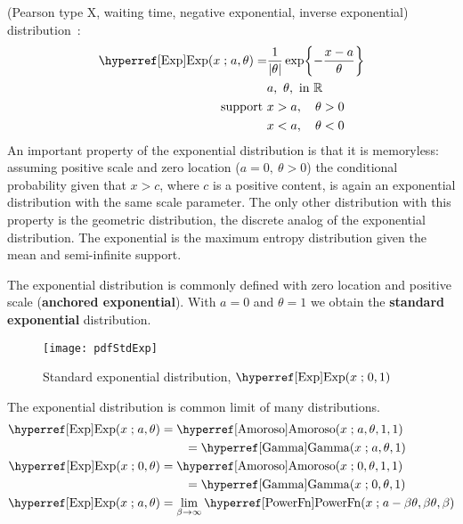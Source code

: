 

\label{sec:Exp}
 (Pearson type X, waiting time, negative exponential, inverse exponential) distribution~\cite{Pearson1916,Kondo1930,Johnson1994}:
%
\begin{align}
\label{Exp}
\opr{Exp}(x \given a, \theta) 
= & \frac{1}{|\theta|} \exp\Left\{-\frac{x-a}{\theta}\Right\} 	\checked
\\ \notag 
& a,\ \theta, \text{ in } \mathbb{R}  					\checked
\\ \notag
\text{support } & x > a, \quad \theta>0 				\checked
\\ \notag
& x < a, \quad \theta<0 							\checked
\end{align}
An important property of the exponential distribution is that it is memoryless: assuming positive scale and zero location ($a=0,\ \theta>0$) the conditional probability given that $x>c$, where $c$ is a positive content, is again an exponential distribution with the same scale parameter. The only other distribution with this property is the geometric distribution, the discrete analog of the exponential distribution. The exponential is the maximum entropy distribution given the mean and semi-infinite support. 





The exponential distribution is commonly defined with zero location and positive scale ({\bf anchored exponential}).
With $a=0$ and $\theta=1$ we obtain the {\bf standard exponential} distribution. 

\begin{figure}[tb]
\begin{center}
\texttt{[image: pdfStdExp]}
\end{center}
\caption[Standard exponential distribution]{Standard exponential distribution, $\opr{Exp}(x\given 0,1)$}
\end{figure}



The exponential distribution is common limit of many distributions.
\begin{align*}
	\opr{Exp} (x\given a,\theta)  
	 &	=  \opr{Amoroso}(x\given  a ,\theta,1,1) 	\checked
\\&		\qquad= \opr{Gamma}(x \given a , \theta, 1)	\checked
\\	\opr{Exp} (x\given 0,\theta)  &	=  \opr{Amoroso}(x\given  0 ,\theta,1,1) \checked
 \\ & \qquad =  \opr{Gamma}(x\given  0, \theta,1)  \checked
\\
\opr{Exp}(x\given a,\theta) &=  \lim_{\beta\rightarrow\infty} \opr{PowerFn} (x\given a-\beta\theta,\beta\theta,\beta) 
\checked
\end{align*}

